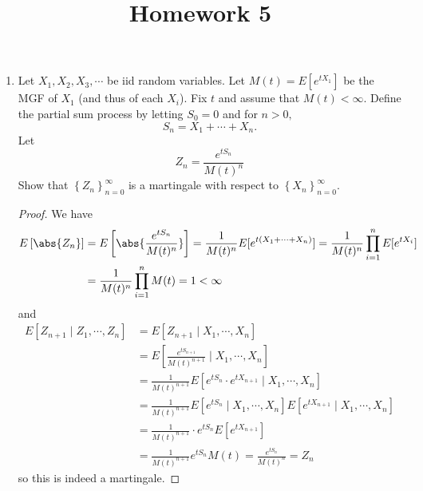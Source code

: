 \documentclass{article}
\begin{document}
\title{Homework 5}
\maketitle
\thispagestyle{fancy}

\begin{enumerate}
	\item Let $X_1, X_2, X_3, \cdots$ be iid random variables. Let $M(t)=E\left[ e^{tX_1} \right]$ be the MGF of $X_1$ (and thus of each $X_i$). Fix $t$ and assume that $M(t)<\infty.$ Define the partial sum process by letting $S_0=0$ and for $n>0,$
		\[S_n=X_1+\cdots+X_n.\]
		Let
		\[Z_n=\frac{e^{tS_n}}{M(t)^n}\]
		Show that $\left\{ Z_n \right\}_{n=0}^\infty$ is a martingale with respect to $\left\{ X_n \right\}_{n=0}^\infty.$
		\begin{proof}
			We have
			\begin{align*}
				E\left[ \abs{Z_n} \right] &= E\left[ \abs{\frac{e^{tS_n}}{M(t)^n}}\right] = \frac{1}{M(t)^n} E[e^{t(X_1+\cdots+X_n)}] = \frac{1}{M(t)^n} \prod_{i=1}^{n} E[e^{tX_i}] \\
				&= \frac{1}{M(t)^n} \prod_{i=1}^{n} M(t) =  1 < \infty
			\end{align*}
			and
			\begin{align*}
				E[Z_{n+1}\mid Z_1, \cdots, Z_n] &= E[Z_{n+1}\mid X_1, \cdots, X_n] \\
				&= E\left[ \frac{e^{tS_{n+1}}}{M(t)^{n+1}} \mid X_1, \cdots, X_n \right] \\
				&= \frac{1}{M(t)^{n+1}} E\left[ e^{tS_n}\cdot e^{tX_{n+1}}\mid X_1, \cdots, X_n \right] \\
				&= \frac{1}{M(t)^{n+1}} E[e^{tS_n}\mid X_1, \cdots, X_n] E[e^{tX_{n+1}}\mid X_1, \cdots, X_n] \\
				&= \frac{1}{M(t)^{n+1}}\cdot e^{tS_n} E[e^{tX_{n+1}}] \\
				&= \frac{1}{M(t)^{n+1}} e^{tS_n} M(t) = \frac{e^{tS_n}}{M(t)^n} = Z_n
			\end{align*}
			so this is indeed a martingale.
		\end{proof}


\end{enumerate}
\end{document}
